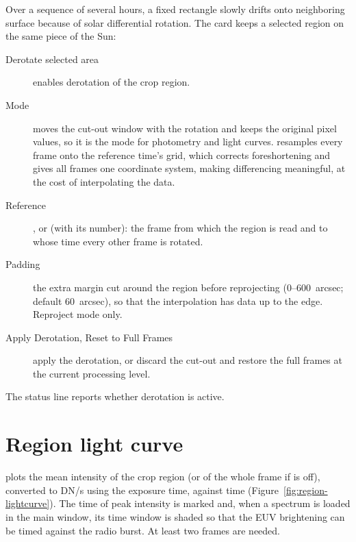 Over a sequence of several hours, a fixed rectangle slowly drifts onto neighboring
surface because of solar differential rotation. The  card keeps a
selected region on the same piece of the Sun:
\begin{description}
  \item[Derotate selected area] enables derotation of the crop region.
  \item[Mode]  moves the cut-out window with the rotation
    and keeps the original pixel values, so it is the mode for photometry and light curves.
     resamples every frame onto the reference time's grid,
    which corrects foreshortening and gives all frames one coordinate system, making
    differencing meaningful, at the cost of interpolating the data.
  \item[Reference] ,  or  (with its
    number): the frame from which the region is read and to whose time every other frame is
    rotated.
  \item[Padding] the extra margin cut around the region before reprojecting (0--600~arcsec;
    default 60~arcsec), so that the interpolation has data up to the edge. Reproject mode only.
  \item[Apply Derotation, Reset to Full Frames] apply the derotation, or discard the cut-out
    and restore the full frames at the current processing level.
\end{description}
The status line reports whether derotation is active.

\section{Region light curve}
\label{sec:region-lightcurve}

 plots the mean intensity of the crop region (or of the whole frame if
 is off), converted to DN/s using the exposure time, against time
(Figure~\ref{fig:region-lightcurve}). The time of peak intensity is marked and, when a
spectrum is loaded in the main window, its time window is shaded so that the EUV brightening
can be timed against the radio burst. At least two frames are needed.


